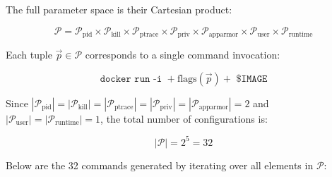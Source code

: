 \documentclass[12pt]{report}
\begin{document}
\begin{doublespace}
The full parameter space is their Cartesian product:

\[
\mathcal{P} = \mathcal{P}_{\text{pid}} \times \mathcal{P}_{\text{kill}} \times \mathcal{P}_{\text{ptrace}} \times \mathcal{P}_{\text{priv}} \times \mathcal{P}_{\text{apparmor}} \times \mathcal{P}_{\text{user}} \times \mathcal{P}_{\text{runtime}}
\]

Each tuple $\vec{p} \in \mathcal{P}$ corresponds to a single command invocation:

\[
\texttt{docker run -i } + \text{flags}(\vec{p}) + \texttt{ \$IMAGE}
\]

Since \(|\mathcal{P}_{\text{pid}}| = |\mathcal{P}_{\text{kill}}| = |\mathcal{P}_{\text{ptrace}}| = |\mathcal{P}_{\text{priv}}| = |\mathcal{P}_{\text{apparmor}}| = 2\) and \(|\mathcal{P}_{\text{user}}| = |\mathcal{P}_{\text{runtime}}| = 1\), the total number of configurations is:

\[
|\mathcal{P}| = 2^5 = 32
\]

\noindent Below are the 32 commands generated by iterating over all elements in $\mathcal{P}$:


\end{doublespace}
\end{document}
